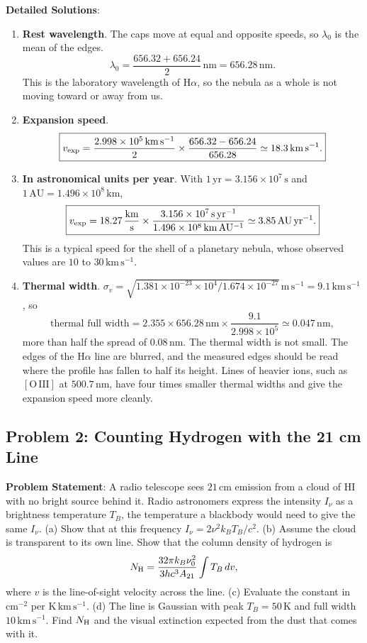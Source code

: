 \textbf{Detailed Solutions}:
\begin{enumerate}[label=(\alph*)]
	\item \textbf{Rest wavelength}. The caps move at equal and opposite speeds, so $\lambda_0$ is the mean of the edges.
	\[
	\boxed{\lambda_0 = \frac{656.32+656.24}{2}\,\mathrm{nm} = 656.28\,\mathrm{nm}.}
	\]
	This is the laboratory wavelength of $\mathrm H\alpha$, so the nebula as a whole is not moving toward or away from us.
	\item \textbf{Expansion speed}.
	\[
	\boxed{v_{\rm exp} = \frac{2.998\times10^{5}\,\mathrm{km\,s^{-1}}}{2}\times\frac{656.32-656.24}{656.28} \simeq 18.3\,\mathrm{km\,s^{-1}}.}
	\]
	\item \textbf{In astronomical units per year}. With $1\,\mathrm{yr}=3.156\times10^{7}\,\mathrm{s}$ and $1\,\mathrm{AU}=1.496\times10^{8}\,\mathrm{km}$,
	\[
	\boxed{v_{\rm exp} = 18.27\,\frac{\mathrm{km}}{\mathrm{s}}\times\frac{3.156\times10^{7}\,\mathrm{s\,yr^{-1}}}{1.496\times10^{8}\,\mathrm{km\,AU^{-1}}} \simeq 3.85\,\mathrm{AU\,yr^{-1}}.}
	\]
	This is a typical speed for the shell of a planetary nebula, whose observed values are $10$ to $30\,\mathrm{km\,s^{-1}}$.
	\item \textbf{Thermal width}. $\sigma_v=\sqrt{1.381\times10^{-23}\times10^4/1.674\times10^{-27}}\,\mathrm{m\,s^{-1}}=9.1\,\mathrm{km\,s^{-1}}$, so
	\[
	\boxed{\text{thermal full width}=2.355\times656.28\,\mathrm{nm}\times\frac{9.1}{2.998\times10^5}\simeq0.047\,\mathrm{nm},}
	\]
	more than half the spread of $0.08\,\mathrm{nm}$. The thermal width is not small. The edges of the $\mathrm H\alpha$ line are blurred, and the measured edges should be read where the profile has fallen to half its height. Lines of heavier ions, such as $[\mathrm{O\,III}]$ at $500.7\,\mathrm{nm}$, have four times smaller thermal widths and give the expansion speed more cleanly.
\end{enumerate}

\subsection{Problem 2: Counting Hydrogen with the 21 cm Line}
\label{is:prob:21cm}

\textbf{Problem Statement}: A radio telescope sees $21\,\mathrm{cm}$ emission from a cloud of HI with no bright source behind it. Radio astronomers express the intensity $I_\nu$ as a brightness temperature $T_B$, the temperature a blackbody would need to give the same $I_\nu$. (a) Show that at this frequency $I_\nu=2\nu^2k_BT_B/c^2$. (b) Assume the cloud is transparent to its own line. Show that the column density of hydrogen is
\[
N_{\rm H}=\frac{32\pi k_B\nu_0^2}{3hc^3A_{21}}\int T_B\,dv ,
\]
where $v$ is the line-of-sight velocity across the line. (c) Evaluate the constant in $\mathrm{cm^{-2}}$ per $\mathrm{K\,km\,s^{-1}}$. (d) The line is Gaussian with peak $T_B=50\,\mathrm K$ and full width $10\,\mathrm{km\,s^{-1}}$. Find $N_{\rm H}$ and the visual extinction expected from the dust that comes with it.

